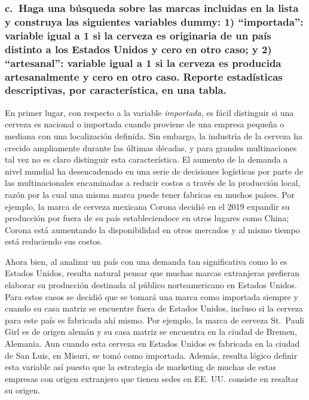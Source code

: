 \documentclass[
]{article}
\begin{document}
\hypertarget{c.-haga-una-buxfasqueda-sobre-las-marcas-incluidas-en-la-lista-y-construya-las-siguientes-variables-dummy-1-importada-variable-igual-a-1-si-la-cerveza-es-originaria-de-un-pauxeds-distinto-a-los-estados-unidos-y-cero-en-otro-caso-y-2-artesanal-variable-igual-a-1-si-la-cerveza-es-producida-artesanalmente-y-cero-en-otro-caso.-reporte-estaduxedsticas-descriptivas-por-caracteruxedstica-en-una-tabla.}{%
\subsubsection{c.~Haga una búsqueda sobre las marcas incluidas en la
lista y construya las siguientes variables dummy: 1) ``importada'':
variable igual a 1 si la cerveza es originaria de un país distinto a los
Estados Unidos y cero en otro caso; y 2) ``artesanal'': variable igual a
1 si la cerveza es producida artesanalmente y cero en otro caso. Reporte
estadísticas descriptivas, por característica, en una
tabla.}\label{c.-haga-una-buxfasqueda-sobre-las-marcas-incluidas-en-la-lista-y-construya-las-siguientes-variables-dummy-1-importada-variable-igual-a-1-si-la-cerveza-es-originaria-de-un-pauxeds-distinto-a-los-estados-unidos-y-cero-en-otro-caso-y-2-artesanal-variable-igual-a-1-si-la-cerveza-es-producida-artesanalmente-y-cero-en-otro-caso.-reporte-estaduxedsticas-descriptivas-por-caracteruxedstica-en-una-tabla.}}

En primer lugar, con respecto a la variable \emph{importada}, es fácil
distinguir si una cerveza es nacional o importada cuando proviene de una
empresa pequeña o mediana con una localización definida. Sin embargo, la
industria de la cerveza ha crecido ampliamente durante las últimas
décadas, y para grandes multinaciones tal vez no es claro distinguir
esta característica. El aumento de la demanda a nivel mundial ha
desencadenado en una serie de decisiones logísticas por parte de las
multinacionales encaminadas a reducir costos a través de la producción
local, razón por la cual una misma marca puede tener fabricas en muchos
países. Por ejemplo, la marca de cerveza mexicana Corona decidió en el
2019 expandir su producción por fuera de su país estableciendoce en
otros lugares como China; Corona está aumentando la disponibilidad en
otros mercados y al mismo tiempo está reduciendo sus costos.

Ahora bien, al analizar un país con una demanda tan significativa como
lo es Estados Unidos, resulta natural pensar que muchas marcas
extranjeras prefieran elaborar su producción destinada al público
norteamericano en Estados Unidos. Para estos casos se decidió que se
tomará una marca como importada siempre y cuando su casa matriz se
encuentre fuera de Estados Unidos, incluso si la cerveza para este país
es fabricada ahí mismo. Por ejemplo, la marca de cerveza St.~Pauli Girl
es de origen alemán y su casa matriz se encuentra en la ciudad de
Bremen, Alemania. Aun cuando esta cerveza en Estados Unidos es fabricada
en la ciudad de San Luis, en Misuri, se tomó como importada. Además,
resulta lógico definir esta variable así puesto que la estrategia de
marketing de muchas de estas empresas con origen extranjero que tienen
sedes en EE. UU. consiste en resaltar su origen.
\end{document}
